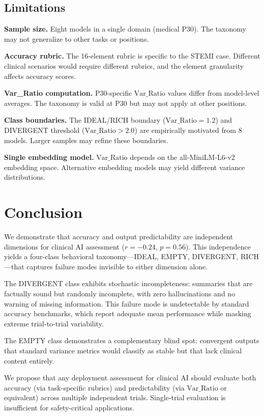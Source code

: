 \documentclass[11pt,a4paper]{article}
\begin{document}
\subsection{Limitations}

\textbf{Sample size.} Eight models in a single domain (medical P30). The taxonomy may not generalize to other tasks or positions.

\textbf{Accuracy rubric.} The 16-element rubric is specific to the STEMI case. Different clinical scenarios would require different rubrics, and the element granularity affects accuracy scores.

\textbf{Var\_Ratio computation.} P30-specific $\text{Var\_Ratio}$ values differ from model-level averages. The taxonomy is valid at P30 but may not apply at other positions.

\textbf{Class boundaries.} The IDEAL/RICH boundary ($\text{Var\_Ratio} = 1.2$) and DIVERGENT threshold ($\text{Var\_Ratio} > 2.0$) are empirically motivated from 8 models. Larger samples may refine these boundaries.

\textbf{Single embedding model.} $\text{Var\_Ratio}$ depends on the all-MiniLM-L6-v2 embedding space. Alternative embedding models may yield different variance distributions.

\section{Conclusion}

We demonstrate that accuracy and output predictability are independent dimensions for clinical AI assessment ($r = -0.24$, $p = 0.56$). This independence yields a four-class behavioral taxonomy---IDEAL, EMPTY, DIVERGENT, RICH---that captures failure modes invisible to either dimension alone.

The DIVERGENT class exhibits stochastic incompleteness: summaries that are factually sound but randomly incomplete, with zero hallucinations and no warning of missing information. This failure mode is undetectable by standard accuracy benchmarks, which report adequate mean performance while masking extreme trial-to-trial variability.

The EMPTY class demonstrates a complementary blind spot: convergent outputs that standard variance metrics would classify as stable but that lack clinical content entirely.

We propose that any deployment assessment for clinical AI should evaluate both accuracy (via task-specific rubrics) and predictability (via $\text{Var\_Ratio}$ or equivalent) across multiple independent trials. Single-trial evaluation is insufficient for safety-critical applications.
\end{document}
